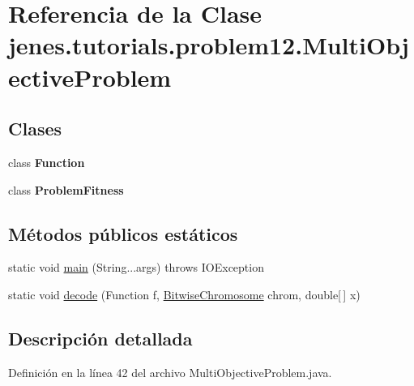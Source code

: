\hypertarget{classjenes_1_1tutorials_1_1problem12_1_1_multi_objective_problem}{\section{Referencia de la Clase jenes.\-tutorials.\-problem12.\-Multi\-Objective\-Problem}
\label{classjenes_1_1tutorials_1_1problem12_1_1_multi_objective_problem}
}
\subsection*{Clases}
\begin{DoxyCompactItemize}
\item 
class {\bfseries Function}
\item 
class {\bfseries Problem\-Fitness}
\end{DoxyCompactItemize}
\subsection*{Métodos públicos estáticos}
\begin{DoxyCompactItemize}
\item 
static void \hyperlink{classjenes_1_1tutorials_1_1problem12_1_1_multi_objective_problem_a8e1b0d92b909d867c5b21b7c8eb866cb}{main} (String...\-args)  throws I\-O\-Exception 
\item 
static void \hyperlink{classjenes_1_1tutorials_1_1problem12_1_1_multi_objective_problem_ad2990b1d319fa2357e088d12e32f6634}{decode} (Function f, \hyperlink{classjenes_1_1chromosome_1_1_bitwise_chromosome}{Bitwise\-Chromosome} chrom, double\mbox{[}$\,$\mbox{]} x)
\end{DoxyCompactItemize}


\subsection{Descripción detallada}


Definición en la línea 42 del archivo Multi\-Objective\-Problem.\-java.



